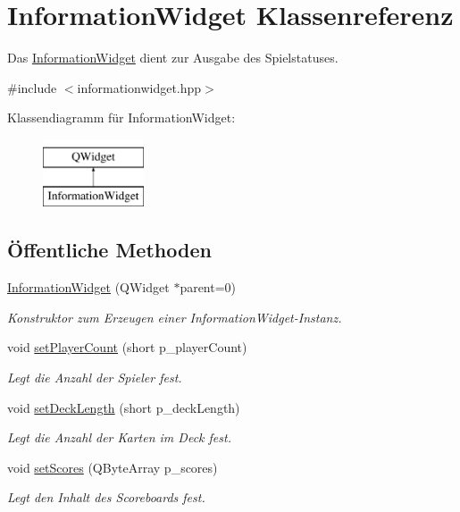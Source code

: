 \hypertarget{class_information_widget}{}\section{Information\+Widget Klassenreferenz}
\label{class_information_widget}


Das \hyperlink{class_information_widget}{Information\+Widget} dient zur Ausgabe des Spielstatuses.  




{\ttfamily \#include $<$informationwidget.\+hpp$>$}

Klassendiagramm für Information\+Widget\+:\begin{figure}[H]
\begin{center}
\leavevmode
\includegraphics[height=2.000000cm]{class_information_widget}
\end{center}
\end{figure}
\subsection*{Öffentliche Methoden}
\begin{DoxyCompactItemize}
\item 
\hyperlink{class_information_widget_aabe49df48595f6e13addb6619105359a}{Information\+Widget} (Q\+Widget $\ast$parent=0)
\begin{DoxyCompactList}\small\item\em Konstruktor zum Erzeugen einer Information\+Widget-\/\+Instanz. \end{DoxyCompactList}\item 
void \hyperlink{class_information_widget_a07210421d5e1283806416489736a1c85}{set\+Player\+Count} (short p\+\_\+player\+Count)
\begin{DoxyCompactList}\small\item\em Legt die Anzahl der Spieler fest. \end{DoxyCompactList}\item 
void \hyperlink{class_information_widget_aca27b73fb7bf5e772327141b0f83d08d}{set\+Deck\+Length} (short p\+\_\+deck\+Length)
\begin{DoxyCompactList}\small\item\em Legt die Anzahl der Karten im Deck fest. \end{DoxyCompactList}\item 
void \hyperlink{class_information_widget_ac79ef86fb429a6179cb90932d2ea8766}{set\+Scores} (Q\+Byte\+Array p\+\_\+scores)
\begin{DoxyCompactList}\small\item\em Legt den Inhalt des Scoreboards fest. \end{DoxyCompactList}\end{DoxyCompactItemize}


